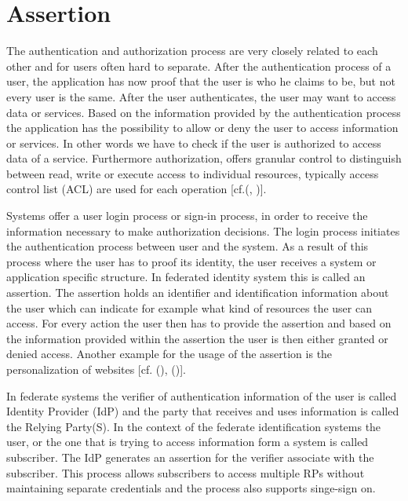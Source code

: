 \section{Assertion}


The authentication and authorization process are very closely related to each other and for users often hard to separate. After the authentication process of a user, the application has now proof that the user is who he claims to be, but not every user is the same. After  the user authenticates, the user may want to access data or services. Based on the information provided by the authentication process the application has the possibility to allow or deny the user to access information or services. In other words we have to check if the user is authorized to access data of a service. Furthermore authorization, offers granular control to distinguish between read, write or execute access to individual resources, typically access control list (ACL) are used for each operation [cf.(\cite{Todorov:2007:MUI}, \cite{Boyed:2012:GSOA})].

  Systems offer a user login process or sign-in process, in order to receive the information necessary to make authorization decisions. The login process initiates the authentication process between user and the system. As a result of this process where the user has to proof its identity, the user receives a system or application specific structure. In federated identity system this is called an assertion. The assertion holds an identifier and identification information about the user which can indicate for example what kind of resources the user can access. For every action the user then has to provide the assertion and based on the information provided within the assertion the user is then either granted or denied access. Another example for the usage of the assertion is the personalization of websites [cf. (\cite{Todorov:2007:MUI}), (\cite{NIST:2017:DIG})].
  
  In federate systems the verifier of authentication information of the user is called Identity Provider (IdP) and the party that receives and uses information is called the Relying Party(S). In the context of the federate identification systems the user, or the one that is trying to access information form a system is called subscriber. The IdP generates an assertion for the verifier associate with the subscriber. This process allows subscribers to access multiple RPs without maintaining separate credentials and the process also supports singe-sign on. \cite{NIST:2017:DIGFA}
   
